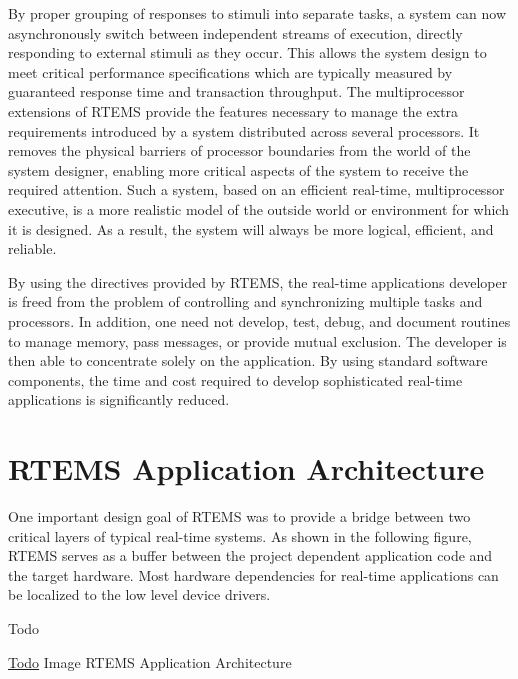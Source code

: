 By proper grouping of responses to stimuli into separate tasks, a system can now asynchronously switch between independent streams of execution, directly responding to external stimuli as they occur. This allows the system design to meet critical performance specifications which are typically measured by guaranteed response time and transaction throughput. The multiprocessor extensions of R\+T\+E\+MS provide the features necessary to manage the extra requirements introduced by a system distributed across several processors. It removes the physical barriers of processor boundaries from the world of the system designer, enabling more critical aspects of the system to receive the required attention. Such a system, based on an efficient real-\/time, multiprocessor executive, is a more realistic model of the outside world or environment for which it is designed. As a result, the system will always be more logical, efficient, and reliable.

By using the directives provided by R\+T\+E\+MS, the real-\/time applications developer is freed from the problem of controlling and synchronizing multiple tasks and processors. In addition, one need not develop, test, debug, and document routines to manage memory, pass messages, or provide mutual exclusion. The developer is then able to concentrate solely on the application. By using standard software components, the time and cost required to develop sophisticated real-\/time applications is significantly reduced.\hypertarget{RTEMSOverview_RTEMSOverviewSecApplicationArchitecture}{}\section{R\+T\+E\+M\+S Application Architecture}\label{RTEMSOverview_RTEMSOverviewSecApplicationArchitecture}
One important design goal of R\+T\+E\+MS was to provide a bridge between two critical layers of typical real-\/time systems. As shown in the following figure, R\+T\+E\+MS serves as a buffer between the project dependent application code and the target hardware. Most hardware dependencies for real-\/time applications can be localized to the low level device drivers.

\begin{DoxyRefDesc}{Todo}
\item[\mbox{\hyperlink{todo__todo000003}{Todo}}]Image R\+T\+E\+MS Application Architecture\end{DoxyRefDesc}


